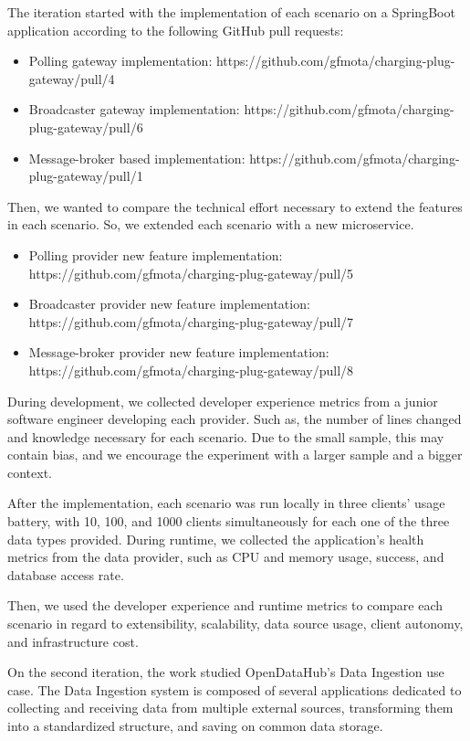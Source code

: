 The iteration started with the implementation of each scenario on a SpringBoot application according to the following GitHub pull requests:

\begin{itemize}
    \item Polling gateway implementation: https://github.com/gfmota/charging-plug-gateway/pull/4
    \item Broadcaster gateway implementation: https://github.com/gfmota/charging-plug-gateway/pull/6
    \item Message-broker based implementation: https://github.com/gfmota/charging-plug-gateway/pull/1
\end{itemize}

Then, we wanted to compare the technical effort necessary to extend the features in each scenario. So, we extended each scenario with a new microservice.

\begin{itemize}
    \item Polling provider new feature implementation: https://github.com/gfmota/charging-plug-gateway/pull/5
    \item Broadcaster provider new feature implementation: https://github.com/gfmota/charging-plug-gateway/pull/7
    \item Message-broker provider new feature implementation: https://github.com/gfmota/charging-plug-gateway/pull/8
\end{itemize}

During development, we collected developer experience metrics from a junior software engineer developing each provider. Such as, the number of lines changed and knowledge necessary for each scenario. Due to the small sample, this may contain bias, and we encourage the experiment with a larger sample and a bigger context. 

After the implementation, each scenario was run locally in three clients' usage battery, with 10, 100, and 1000 clients simultaneously for each one of the three data types provided. During runtime, we collected the application’s health metrics from the data provider, such as CPU and memory usage, success, and database access rate.

Then, we used the developer experience and runtime metrics to compare each scenario in regard to extensibility, scalability, data source usage, client autonomy, and infrastructure cost.  

On the second iteration, the work studied OpenDataHub's Data Ingestion use case. The Data Ingestion system is composed of several applications dedicated to collecting and receiving data from multiple external sources, transforming them into a standardized structure, and saving on common data storage.

